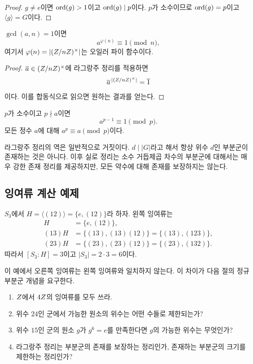 \begin{proof}
$g\ne e$이면 $\operatorname{ord}(g)>1$이고 $\operatorname{ord}(g)\mid p$이다. $p$가 소수이므로 $\operatorname{ord}(g)=p$이고 $\langle g\rangle=G$이다.
\end{proof}

\begin{corollary}[오일러 정리]
$\gcd(a,n)=1$이면
\[
  a^{\varphi(n)}\equiv1\pmod n,
\]
여기서 $\varphi(n)=|(Z/nZ)^\times|$는 오일러 파이 함수이다.
\end{corollary}

\begin{proof}
$\overline a\in(Z/nZ)^\times$에 라그랑주 정리를 적용하면
\[
  \overline a^{\,|(Z/nZ)^\times|}=\overline1
\]
이다. 이를 합동식으로 읽으면 원하는 결과를 얻는다.
\end{proof}

\begin{corollary}
$p$가 소수이고 $p\nmid a$이면
\[
  a^{p-1}\equiv1\pmod p.
\]
모든 정수 $a$에 대해 $a^p\equiv a\pmod p$이다.
\end{corollary}

\begin{remark}
라그랑주 정리의 역은 일반적으로 거짓이다. $d\mid|G|$라고 해서 항상 위수 $d$인 부분군이 존재하는 것은 아니다. 이후 실로 정리는 소수 거듭제곱 차수의 부분군에 대해서는 매우 강한 존재 정리를 제공하지만, 모든 약수에 대해 존재를 보장하지는 않는다.
\end{remark}

\subsection{잉여류 계산 예제}

\begin{example}
$S_3$에서 $H=\langle(12)\rangle=\{e,(12)\}$라 하자. 왼쪽 잉여류는
\[
\begin{aligned}
 H&=\{e,(12)\},\\
 (13)H&=\{(13),(13)(12)\}=\{(13),(123)\},\\
 (23)H&=\{(23),(23)(12)\}=\{(23),(132)\}.
\end{aligned}
\]
따라서 $[S_3:H]=3$이고 $|S_3|=2\cdot3=6$이다.
\end{example}

이 예에서 오른쪽 잉여류는 왼쪽 잉여류와 일치하지 않는다. 이 차이가 다음 절의 정규부분군 개념을 요구한다.

\begin{checkpoint}
\begin{enumerate}[label=\arabic*.]
  \item $Z$에서 $4Z$의 잉여류를 모두 쓰라.
  \item 위수 $24$인 군에서 가능한 원소의 위수는 어떤 수들로 제한되는가?
  \item 위수 $15$인 군의 원소 $g$가 $g^6=e$를 만족한다면 $g$의 가능한 위수는 무엇인가?
  \item 라그랑주 정리는 부분군의 존재를 보장하는 정리인가, 존재하는 부분군의 크기를 제한하는 정리인가?
\end{enumerate}
\end{checkpoint}
